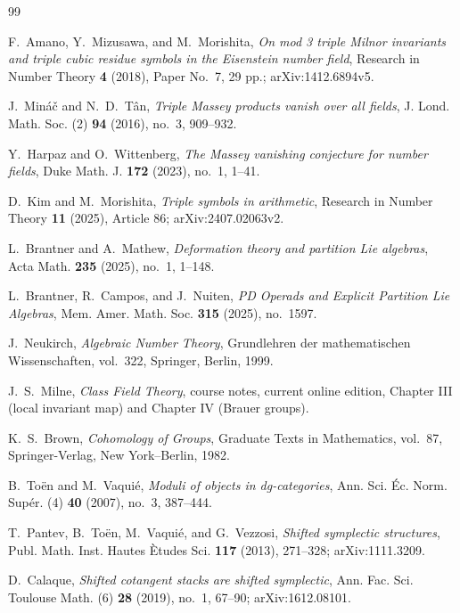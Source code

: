 \documentclass[11pt]{article}
\theoremstyle{remark}
\begin{document}
\begin{thebibliography}{99}

F.~Amano, Y.~Mizusawa, and M.~Morishita,
\emph{On mod 3 triple Milnor invariants and triple cubic residue symbols in the Eisenstein number field},
Research in Number Theory \textbf{4} (2018), Paper No.~7, 29 pp.; arXiv:1412.6894v5.

J.~Min\'a\v{c} and N.~D.~T\^an,
\emph{Triple Massey products vanish over all fields},
J. Lond. Math. Soc. (2) \textbf{94} (2016), no.~3, 909--932.

Y.~Harpaz and O.~Wittenberg,
\emph{The Massey vanishing conjecture for number fields},
Duke Math. J. \textbf{172} (2023), no.~1, 1--41.

D.~Kim and M.~Morishita,
\emph{Triple symbols in arithmetic},
Research in Number Theory \textbf{11} (2025), Article 86; arXiv:2407.02063v2.

L.~Brantner and A.~Mathew,
\emph{Deformation theory and partition Lie algebras},
Acta Math. \textbf{235} (2025), no.~1, 1--148.

L.~Brantner, R.~Campos, and J.~Nuiten,
\emph{PD Operads and Explicit Partition Lie Algebras},
Mem. Amer. Math. Soc. \textbf{315} (2025), no.~1597.

J.~Neukirch,
\emph{Algebraic Number Theory},
Grundlehren der mathematischen Wissenschaften, vol.~322,
Springer, Berlin, 1999.

J.~S.~Milne,
\emph{Class Field Theory},
course notes, current online edition, Chapter III (local invariant map) and Chapter IV (Brauer groups).

K.~S.~Brown,
\emph{Cohomology of Groups},
Graduate Texts in Mathematics, vol.~87,
Springer-Verlag, New York--Berlin, 1982.

B.~To\"en and M.~Vaqui\'e,
\emph{Moduli of objects in dg-categories},
Ann. Sci. \'Ec. Norm. Sup\'er. (4) \textbf{40} (2007), no.~3, 387--444.

T.~Pantev, B.~To\"en, M.~Vaqui\'e, and G.~Vezzosi,
\emph{Shifted symplectic structures},
Publ. Math. Inst. Hautes \`Etudes Sci. \textbf{117} (2013), 271--328;
arXiv:1111.3209.

D.~Calaque,
\emph{Shifted cotangent stacks are shifted symplectic},
Ann. Fac. Sci. Toulouse Math. (6) \textbf{28} (2019), no.~1, 67--90;
arXiv:1612.08101.


\end{thebibliography}
\end{document}
